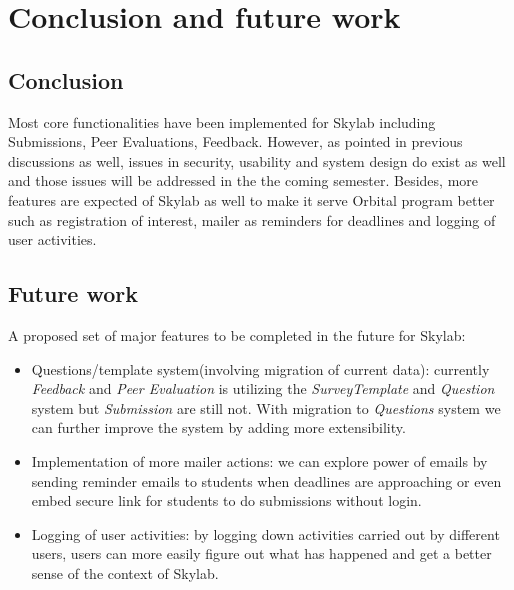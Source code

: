 \chapter{Conclusion and future work} \label{conclusionandfuturework}

\section{Conclusion}

Most core functionalities have been implemented for Skylab including Submissions, Peer Evaluations, Feedback. However, as pointed in previous discussions as well, issues in security, usability and system design do exist as well and those issues will be addressed in the the coming semester. Besides, more features are expected of Skylab as well to make it serve Orbital program better such as registration of interest, mailer as reminders for deadlines and logging of user activities.

\section{Future work}

A proposed set of major features to be completed in the future for Skylab:

\begin{itemize}
  \item Questions/template system(involving migration of current data): currently \textit{Feedback} and \textit{Peer Evaluation} is utilizing the \textit{SurveyTemplate} and \textit{Question} system but \textit{Submission} are still not. With migration to \textit{Questions} system we can further improve the system by adding more extensibility.
  \item Implementation of more mailer actions: we can explore power of emails by sending reminder emails to students when deadlines are approaching or even embed secure link for students to do submissions without login.
  \item Logging of user activities: by logging down activities carried out by different users, users can more easily figure out what has happened and get a better sense of the context of Skylab.
\end{itemize}

